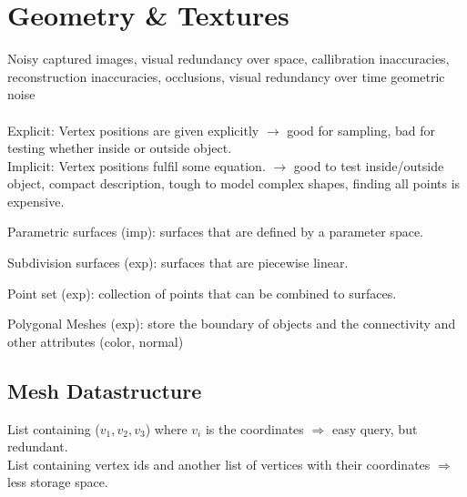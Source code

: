 \section{Geometry \& Textures}
 Noisy captured images, visual redundancy over space, callibration inaccuracies, reconstruction inaccuracies, occlusions, visual redundancy over time geometric noise \\
 \\
Explicit: Vertex positions are given explicitly $\rightarrow$ good for sampling, bad for testing whether inside or outside object.\\
Implicit: Vertex positions fulfil some equation. $\rightarrow$ good to test inside/outside object, compact description, tough to model complex shapes, finding all points is expensive.\\
\begin{compactitem}
    \item Parametric surfaces (imp): surfaces that are defined by a
parameter space. 
    \item Subdivision surfaces (exp): surfaces that are piecewise linear.
    \item Point set (exp): collection of points that can be
combined to surfaces.
    \item Polygonal Meshes (exp): store the boundary of objects and the connectivity and other attributes (color, normal)
\end{compactitem}

\subsection*{Mesh Datastructure}

 List containing ($v_1, v_2, v_3$) where $v_i$ is the coordinates $\Rightarrow$ easy query, but redundant.\\
 List containing vertex ids and another list of vertices with their coordinates $\Rightarrow$ less storage space.

